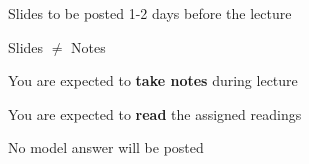 \begin{frame}
\begin{center}
\large
Slides to be posted 1-2 days before the lecture
\end{center}
\end{frame}

\begin{frame}
\begin{center}
\large
Slides $\not=$ Notes
\end{center}
\end{frame}

\begin{frame}
\begin{center}
\large
You are expected to \textbf{take notes} during lecture
\end{center}
\end{frame}

\begin{frame}
\begin{center}
\large
You are expected to \textbf{read} the assigned readings
\end{center}
\end{frame}

\begin{frame}
\begin{center}
\large
No model answer will be posted
\end{center}
\end{frame}


